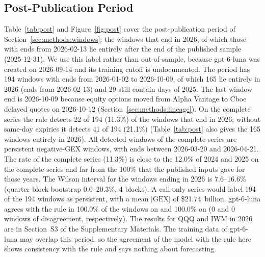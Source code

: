 \subsection{Post-Publication Period}
\label{sec:results:post}

Table~\ref{tab:post} and Figure~\ref{fig:post} cover the post-publication period of Section~\ref{sec:methods:windows}: the windows that end in 2026, of which those with ends from 2026-02-13 lie entirely after the end of the published sample (2025-12-31). We use this label rather than out-of-sample, because gpt-6-luna was created on 2026-09-14 and its training cutoff is undocumented.
The period has 194 windows with ends from 2026-01-02 to 2026-10-09, of which 165 lie entirely in 2026 (ends from 2026-02-13) and 29 still contain days of 2025. The last window end is 2026-10-09 because equity options moved from Alpha Vantage to Cboe delayed quotes on 2026-10-12 (Section~\ref{sec:methods:lineage}). On the complete series the rule detects 22 of 194 (11.3\%) of the windows that end in 2026; without same-day expiries it detects 41 of 194 (21.1\%) (Table~\ref{tab:post} also gives the 165 windows entirely in 2026). All detected windows of the complete series are persistent negative-GEX windows, with ends between 2026-03-20 and 2026-04-21. The rate of the complete series (11.3\%) is close to the 12.0\% of 2024 and 2025 on the complete series and far from the 100\% that the published inputs gave for those years. The Wilson interval for the windows ending in 2026 is 7.6--16.6\% (quarter-block bootstrap 0.0--20.3\%, 4 blocks). A call-only series would label 194 of the 194 windows as persistent, with a mean $|\mathrm{GEX}|$ of \$21.74~billion. gpt-6-luna agrees with the rule in 100.0\% of the windows on  and 100.0\% on  (0 and 0 windows of disagreement, respectively). The results for QQQ and IWM in 2026 are in Section~S3 of the Supplementary Materials. The training data of gpt-6-luna may overlap this period, so the agreement of the model with the rule here shows consistency with the rule and says nothing about forecasting.

